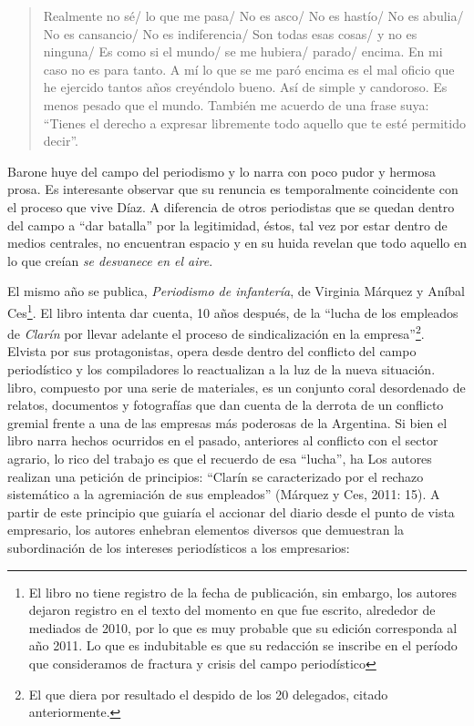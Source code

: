 \begin{quote}
Realmente no sé/ lo que me pasa/ No es asco/ No es hastío/ No es abulia/ No es cansancio/ No es indiferencia/ Son todas esas cosas/ y no es ninguna/ Es como si el mundo/ se me hubiera/ parado/ encima. En mi caso no es para tanto. A mí lo que se me paró encima es el mal oficio que he ejercido tantos años creyéndolo bueno. Así de simple y candoroso. Es menos pesado que el mundo. También me acuerdo de una frase suya: \enquote{Tienes el derecho a expresar libremente todo aquello que te esté permitido decir}.
\end{quote}

Barone huye del campo del periodismo y lo narra con poco pudor y hermosa prosa. Es interesante observar que su renuncia es temporalmente coincidente con el proceso que vive Díaz. A diferencia de otros periodistas que se quedan dentro del campo a \enquote{dar batalla} por la legitimidad, éstos, tal vez por estar dentro de medios centrales, no encuentran espacio y en su huida revelan que todo aquello en lo que creían \emph{se desvanece en el aire}.

El mismo año se publica, \emph{Periodismo de infantería}, de Virginia Márquez y Aníbal Ces\footnote{El libro no tiene registro de la fecha de publicación, sin embargo, los autores dejaron registro en el texto del momento en que fue escrito, alrededor de mediados de 2010, por lo que es muy probable que su edición corresponda al año 2011. Lo que es indubitable es que su redacción se inscribe en el período que consideramos de fractura y crisis del campo periodístico}. El libro intenta dar cuenta, 10 años después, de la \enquote{lucha de los empleados de \emph{Clarín} por llevar adelante el proceso de sindicalización en la empresa}\footnote{El que diera por resultado el despido de los 20 delegados, citado anteriormente.}. Elvista por sus protagonistas, opera desde dentro del conflicto del campo periodístico y los compiladores lo reactualizan a la luz de la nueva situación. libro, compuesto por una serie de materiales, es un conjunto coral desordenado de relatos, documentos y fotografías que dan cuenta de la derrota de un conflicto gremial frente a una de las empresas más poderosas de la Argentina. Si bien el libro narra hechos ocurridos en el pasado, anteriores al conflicto con el sector agrario, lo rico del trabajo es que el recuerdo de esa \enquote{lucha},
ha
Los autores realizan una petición de principios: \enquote{Clarín se  caracterizado por el rechazo sistemático a la agremiación de sus empleados} (Márquez y Ces, 2011: 15). A partir de este principio que guiaría el accionar del diario desde el punto de vista empresario, los autores enhebran elementos diversos que demuestran la subordinación de los intereses periodísticos a los empresarios:

